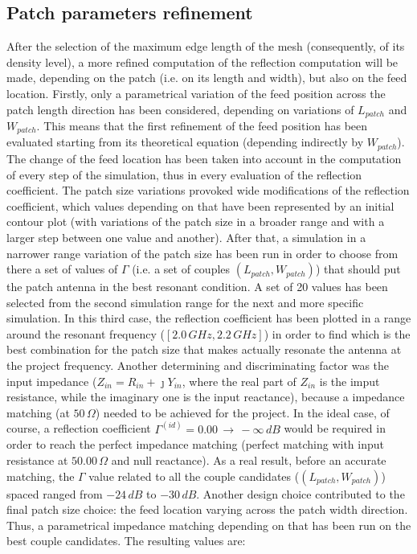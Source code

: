 \documentclass[12pt,a4paper]{article}
\begin{document}
{\subsection*{Patch parameters refinement}
After the selection of the maximum edge length of the mesh (consequently, of its density level), a more refined computation of the reflection computation will be made, depending on the patch (i.e. on its length and width), but also on the feed location. Firstly, only a parametrical variation of the feed position across the patch length direction has been considered, depending on variations of $L_{patch}$ and $W_{patch}$. This means that the first refinement of the feed position has been evaluated starting from its theoretical equation (depending indirectly by $W_{patch}$). The change of the feed location has been taken into account in the computation of every step of the simulation, thus in every evaluation of the reflection coefficient. The patch size variations provoked wide modifications of the reflection coefficient, which values depending on that have been represented by an initial contour plot (with variations of the patch size in a broader range and with a larger step between one value and another). After that, a simulation in a narrower range variation of the patch size has been run in order to choose from there a set of values of $\Gamma$ (i.e. a set of couples $(L_{patch},W_{patch})$) that should put the patch antenna in the best resonant condition. A set of 20 values has been selected from the second simulation range for the next and more specific simulation. In this third case, the reflection coefficient has been plotted in a range around the resonant frequency ($[2.0\,GHz, 2.2\,GHz]$) in order to find which is the best combination for the patch size that makes actually resonate the antenna at the project frequency. Another determining and discriminating factor was the input impedance ($Z_{in}=R_{in}+\jmath Y_{in}$, where the real part of $Z_{in}$ is the imput resistance, while the imaginary one is the input reactance), because a impedance matching (at $50\,\Omega$) needed to be achieved for the project. In the ideal case, of course, a reflection coefficient $\Gamma^{(id)}=0.00\,\to\,-\infty\,dB$ would be required in order to reach the perfect impedance matching (perfect matching with input resistance at $50.00\,\Omega$ and null reactance). As a real result, before an accurate matching, the $\Gamma$ value related to all the couple candidates ($(L_{patch},W_{patch})$) spaced ranged from $-24\,dB$ to $-30\,dB$. Another design choice contributed to the final patch size choice: the feed location varying across the patch width direction. Thus, a parametrical impedance matching depending on that has been run on the best couple candidates. The resulting values are:
}
\end{document}
